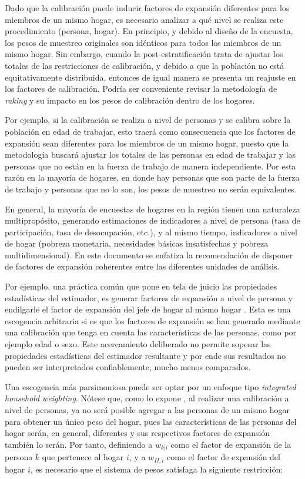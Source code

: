\documentclass[
  12pt,
  spanish,
]{book}
\begin{document}
Dado que la calibración puede inducir factores de expansión diferentes para los miembros de un mismo hogar, es necesario analizar a qué nivel se realiza este procedimiento (persona, hogar). En principio, y debido al diseño de la encuesta, los pesos de muestreo originales son idénticos para todos los miembros de un mismo hogar. Sin embargo, cuando la post-estratificación trata de ajustar los totales de las restricciones de calibración, y debido a que la población no está equitativamente distribuida, entonces de igual manera se presenta un reajuste en los factores de calibración. Podría ser conveniente revisar la metodología de \emph{raking} y su impacto en los pesos de calibración dentro de los hogares.

Por ejemplo, si la calibración se realiza a nivel de personas y se calibra sobre la población en edad de trabajar, esto traerá como consecuencia que los factores de expansión sean diferentes para los miembros de un mismo hogar, puesto que la metodología buscará ajustar los totales de las personas en edad de trabajar y las personas que no están en la fuerza de trabajo de manera independiente. Por esta razón en la mayoría de hogares, en donde hay personas que son parte de la fuerza de trabajo y personas que no lo son, los pesos de muestreo no serán equivalentes.

En general, la mayoría de encuestas de hogares en la región tienen una naturaleza multipropósito, generando estimaciones de indicadores a nivel de persona (tasa de participación, tasa de desocupación, etc.), y al mismo tiempo, indicadores a nivel de hogar (pobreza monetaria, necesidades básicas insatisfechas y pobreza multidimensional). En este documento se enfatiza la recomendación de disponer de factores de expansión coherentes entre las diferentes unidades de análisis.

Por ejemplo, una práctica común que pone en tela de juicio las propiedades estadísticas del estimador, es generar factores de expansión a nivel de persona y endilgarle el factor de expansión del jefe de hogar al mismo hogar \citep{Alexander_1987}. Esta es una escogencia arbitraria si es que los factores de expansión se han generado mediante una calibración que tenga en cuenta las características de las personas, como por ejemplo edad o sexo. Este acercamiento deliberado no permite sopesar las propiedades estadísticas del estimador resultante y por ende sus resultados no pueden ser interpretados confiablemente, mucho menos comparados.

Una escogencia más parsimoniosa puede ser optar por un enfoque tipo \emph{integrated household weighting}. Nótese que, como lo expone \citet{Heldal_1992}, al realizar una calibración a nivel de personas, ya no será posible agregar a las personas de un mismo hogar para obtener un único peso del hogar, pues las características de las personas del hogar serán, en general, diferentes y sus respectivos factores de expansión también lo serán. Por tanto, definiendo a \(w_{k|i}\) como el factor de expansión de la persona \(k\) que pertenece al hogar \(i\), y a \(w_{II,i}\) como el factor de expansión del hogar \(i\), es necesario que el sistema de pesos satisfaga la siguiente restricción:
\end{document}
